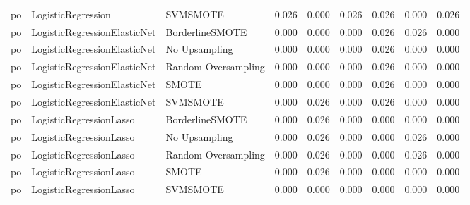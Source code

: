 \begin{tabular}{lllllllll}
      po &           LogisticRegression &            SVMSMOTE & 0.026 &                     0.000 &                 0.026 &                  0.026 &                                   0.000 &     0.026 \\
      po & LogisticRegressionElasticNet &     BorderlineSMOTE & 0.000 &                     0.000 &                 0.000 &                  0.026 &                                   0.026 &     0.000 \\
      po & LogisticRegressionElasticNet &       No Upsampling & 0.000 &                     0.000 &                 0.000 &                  0.026 &                                   0.000 &     0.000 \\
      po & LogisticRegressionElasticNet & Random Oversampling & 0.000 &                     0.000 &                 0.000 &                  0.026 &                                   0.000 &     0.000 \\
      po & LogisticRegressionElasticNet &               SMOTE & 0.000 &                     0.000 &                 0.000 &                  0.026 &                                   0.000 &     0.000 \\
      po & LogisticRegressionElasticNet &            SVMSMOTE & 0.000 &                     0.026 &                 0.000 &                  0.026 &                                   0.000 &     0.000 \\
      po &      LogisticRegressionLasso &     BorderlineSMOTE & 0.000 &                     0.026 &                 0.000 &                  0.000 &                                   0.000 &     0.000 \\
      po &      LogisticRegressionLasso &       No Upsampling & 0.000 &                     0.026 &                 0.000 &                  0.000 &                                   0.026 &     0.000 \\
      po &      LogisticRegressionLasso & Random Oversampling & 0.000 &                     0.026 &                 0.000 &                  0.000 &                                   0.026 &     0.000 \\
      po &      LogisticRegressionLasso &               SMOTE & 0.000 &                     0.026 &                 0.000 &                  0.000 &                                   0.000 &     0.000 \\
      po &      LogisticRegressionLasso &            SVMSMOTE & 0.000 &                     0.000 &                 0.000 &                  0.000 &                                   0.000 &     0.000 \\

\end{tabular}
